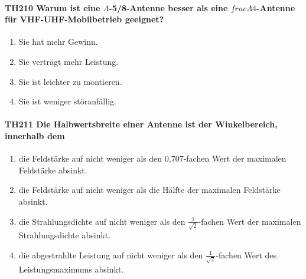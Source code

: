 \documentclass[8pt]{article}
\begin{document}
\paragraph*{TH210 Warum ist eine $\Lambda$-5/8-Antenne besser als eine $frac{\Lambda}{4}$-Antenne für VHF-UHF-Mobilbetrieb geeignet?}
\begin{enumerate}[nolistsep,label=\Alph*]
\item Sie hat mehr Gewinn.
\item Sie verträgt mehr Leistung.
\item Sie ist leichter zu montieren.
\item Sie ist weniger störanfällig.
\end{enumerate}

\paragraph*{TH211 Die Halbwertsbreite einer Antenne ist der Winkelbereich, innerhalb dem} 
\begin{enumerate}[nolistsep,label=\Alph*]
\item die Feldstärke auf nicht weniger als den 0,707-fachen Wert der maximalen Feldstärke absinkt.
\item die Feldstärke auf nicht weniger als die Hälfte der maximalen Feldstärke absinkt.
\item die Strahlungsdichte auf nicht weniger als den $\frac{1}{\sqrt{2}}$-fachen Wert der maximalen Strahlungsdichte absinkt.
\item die abgestrahlte Leistung auf nicht weniger als den $\frac{1}{\sqrt{2}}$-fachen Wert des Leistungsmaximums absinkt.
\end{enumerate}
\end{document}
